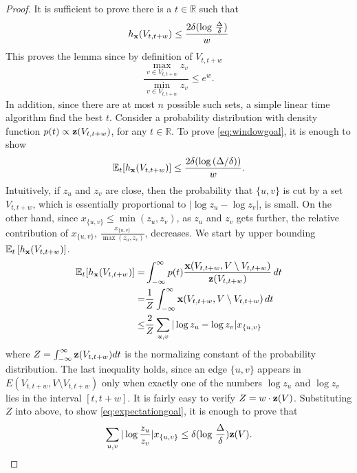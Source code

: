 \documentclass[11pt]{article}
\def\bx{{\bf x}}
\def\bz{{\bf z}}
\def\R{\mathbb{R}}
\def\mE{\mathbb{E}}
\newcommand{\EE}[2]{\mE_{#1}\left[#2\right]}
\def\h{h}
\begin{document}
\begin{proof}
It is sufficient to prove there is a $t \in \R $ such that 
\begin{equation}\label{eq:windowgoal}
h_\bx(V_{t,t+w})\leq \dfrac{2\delta(\log \, \frac{\Delta}{\delta})}{w}	
\end{equation}
 This proves the lemma since by definition of $V_{t,t+w}$ 
$$\frac{\max_{v \in V_{t,t+w} }z_v}{\min_{v \in V_{t,t+w}} z_v} \leq e^w.$$
In addition, since there are at most $n$ possible such sets, a simple linear time algorithm find the best $t$. Consider a  probability distribution with density function $p(t)\propto \bz(V_{t,t+w})$, for any $t \in \R$. To prove \eqref{eq:windowgoal}, it is enough to show  
\begin{equation}
\label{eq:expectationgoal}
\mathbb{E}_t [h_\bx(V_{t,t+w})]\leq \frac{2\delta(\log \, (\Delta/\delta))}{w}.
\end{equation}  
Intuitively, if $z_u$ and $z_v$ are close, then the  probability that 
$\{u,v\}$ is cut by a set $V_{t,t+w}$, which is essentially proportional 
to $ |\log z_u - \log z_v|$, is small. On the other hand, since 
$x_{\{u,v\}} \leq \min(z_u,z_v)$,  as $z_u$ and $z_v$ gets further, the 
relative contribution of $x_{\{u,v\}}$, $\frac{x_{\{u,v\}}}{\max (z_u,z_v)}$, 
decreases. 
We start by upper bounding $\EE{t}{\h_\bx(V_{t,t+w})}$.
\begin{eqnarray*}
\mathbb{E}_{t}[h_\bx(V_{t,t+w})] 
=&  \displaystyle\int_{-\infty}^{\infty} p(t)\dfrac{\bx(V_{t,t+w},V \setminus {V_{t,t+w}})}{\bz(V_{t,t+w})}\,dt \\ 
=& \dfrac{1}{Z} \displaystyle\int_{-\infty}^{\infty} \bx(V_{t,t+w},V \setminus {V_{t,t+w}})\,dt\\
\leq & \dfrac{2}{Z} \sum_{u,v}|\log z_u - \log z_v|x_{\{u,v\}}
\end{eqnarray*}
where $Z=\int_{-\infty}^{\infty} \bz(V_{t,t+w})dt$ is the normalizing 
constant of the probability distribution. The last inequality holds, 
since an edge $\{u,v\}$ appears in $E(V_{t,t+w},V\setminus{V_{t,t+w}})$ 
only when exactly one of  the numbers $\log z_u$ and $\log z_v$ lies 
in the interval $[t,t+w]$.
It is fairly easy to verify  $Z = w \cdot \bz(V)$. Substituting $Z$ 
into above, to show \eqref{eq:expectationgoal}, it is enough to prove 
that 
\begin{equation}\label{eq:mainineq} \sum_{u,v}|\log \frac{ z_u } 
{z_v}|x_{\{u,v\}} \leq \delta(\log \, \frac{\Delta}{\delta}) \bz(V).
\end{equation}


\end{proof}
\end{document}
